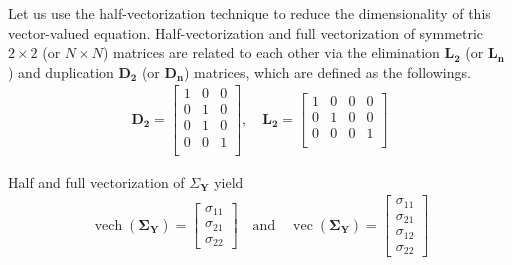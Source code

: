 \documentclass{article}
\begin{document}
Let us use the half-vectorization technique \citep{MagnusNeudecker1999} to reduce the dimensionality of this vector-valued equation. Half-vectorization and full vectorization of symmetric  $2 \times 2 $ (or $N \times N $) matrices are related to each other via the elimination $\mathbf{L_2}$ (or $\mathbf{L_n}$ ) and duplication $\mathbf{D_2}$ (or $\mathbf{D_n}$) matrices, which are defined as the followings.
\begin{equation}
\begin{aligned}
\mathbf{D_2}=
\begin{bmatrix}
1 &0 &0 \\
0 &1 &0 \\
0 &1 &0\\
0 &0 &1 \\
\end{bmatrix}, \quad
\mathbf{L_2}=
\begin{bmatrix}
1 &0 &0 &0 \\
0 &1 &0  &0\\
0 &0 &0 &1\\
\end{bmatrix}
\end{aligned}
\end{equation}



Half and full vectorization of $\Sigma_\mathbf{Y}$ yield
\begin{equation}
\begin{aligned}
\operatorname{vech}(\boldsymbol{\Sigma}_\mathbf{Y})=
\begin{bmatrix}
\sigma_{11}\\
\sigma_{21} \\
\sigma_{22}
\end{bmatrix} \quad\text{and}\quad
\operatorname{vec}(\boldsymbol{\Sigma}_\mathbf{Y})=
\begin{bmatrix}
\sigma_{11}\\
\sigma_{21} \\
\sigma_{12} \\
\sigma_{22}
\end{bmatrix}
\end{aligned}
\end{equation}
\end{document}
